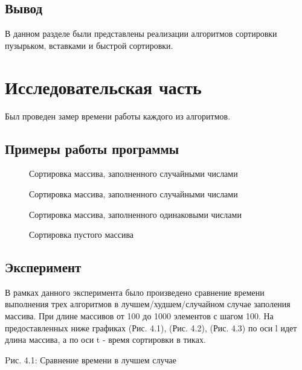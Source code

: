 \documentclass[12pt]{report}
\begin{document}
\section{Вывод}
В данном разделе были представлены реализации алгоритмов сортировки пузырьком, вставками и быстрой сортировки.

\chapter{Исследовательская часть}
Был проведен замер времени работы каждого из алгоритмов.

\section{Примеры работы программы}
\begin{figure}[h]
\caption{Сортировка массива, заполненного случайными числами}
\label{ris:image}
\end{figure}
\newpage
\begin{figure}[h]
\caption{Сортировка массива, заполненного случайными числами}
\label{ris:image}
\end{figure}

\begin{figure}[h]
\caption{Сортировка массива, заполненного одинаковыми числами}
\label{ris:image}
\end{figure}
\newpage
\begin{figure}[h]
\caption{Сортировка пустого массива}
\label{ris:image}
\end{figure}

\section{Эксперимент}
В рамках данного эксперимента было произведено сравнение времени выполнения трех алгоритмов в лучшем/худшем/случайном
случае заполения массива. При длине массивов от 100 до 1000 элементов с шагом 100. На предоставленных ниже графиках (Рис. 4.1), (Рис. 4.2), (Рис. 4.3)
по оси l идет длина массива, а по оси t - время сортировки в тиках.

\begin{center}
Pис. 4.1: Сравнение времени в лучшем случае
\end{center}
\end{document}
